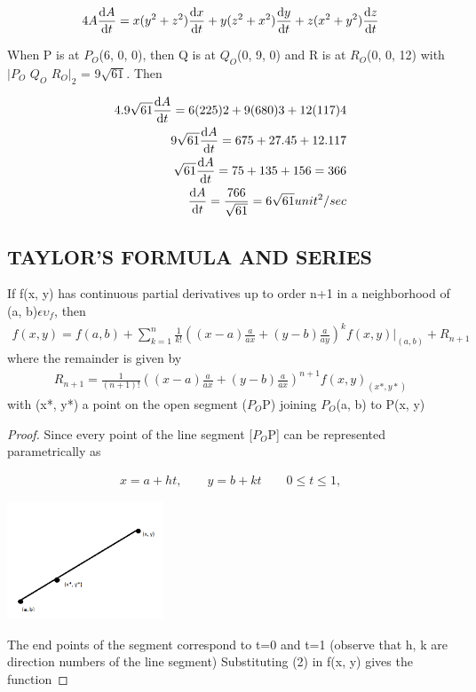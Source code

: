 \documentclass[11pt]{amsbook}
\begin{document}
\begin{align*}
4A \frac{\mathrm{d} A}{\mathrm{d} t} = x(y^2+z^2) \frac{\mathrm{d} x}{\mathrm{d} t} + y(z^2+x^2) \frac{\mathrm{d} y}{\mathrm{d} t} + z(x^2+y^2)  \frac{\mathrm{d} z}{\mathrm{d} t}
\end{align*}

When P is at $P_{O}$(6, 0, 0), then Q is at $Q_{O}$(0, 9, 0) and R is at $R_{O}$(0, 0, 12) with $|P_{O}$  $Q_{O}$  $R_{O}|_{2}$ = 9$\sqrt{61}$. Then

\begin{align*}
4.9\sqrt{61}\frac{\mathrm{d} A}{\mathrm{d} t} = 6(225)2+ 9(680)3 + 12(117)4 \\
9\sqrt{61}\frac{\mathrm{d} A}{\mathrm{d} t} = 675 + 27.45 + 12.117 \\
\sqrt{61}\frac{\mathrm{d} A}{\mathrm{d} t} = 75 + 135 + 156 = 366 \\
\frac{\mathrm{d} A}{\mathrm{d} t} = \frac{766}{\sqrt{61}} = 6\sqrt{61}  unit^2/sec
\end{align*}

\subsection{TAYLOR'S FORMULA AND SERIES}

\begin{thm} If f(x, y) has continuous partial derivatives up to order n+1 in a neighborhood of (a, b)$\epsilon \upsilon_{f}$, then
\begin{align*}
f(x, y) = f(a, b) +  \sum_{k=1}^{n}  \frac{1}{k!} ((x-a) \frac{a}{ax} + (y-b) \frac{a}{ay})^k f(x, y) |_{(a, b)} + R_{n+1}
\end{align*}
where the remainder is given by
\begin{align*}
R_{n+1} = \frac{1}{(n+1)!} ((x-a) \frac{a}{ax} + (y-b) \frac{a}{ax})^{n+1}f(x, y)_{(x*, y*)}
\end{align*}
with (x*, y*) a point on the open segment ($P_{O}$P) joining $P_{O}$(a, b) to P(x, y) 
\end{thm}
\begin{proof} Since every point of the line segment [$P_{O}$P] can be represented parametrically as



\begin{align*}
x = a+ht,\qquad   y = b+kt\qquad	  0\leq t \leq 1,
\end{align*} 

\includegraphics[width=0.35\textwidth]{images/b2p2-312-fig01}

The end points of the segment correspond to t=0 and t=1 (observe that h, k are direction numbers of the line segment)
Substituting (2) in f(x, y) gives the function

\end{proof}
\end{document}

